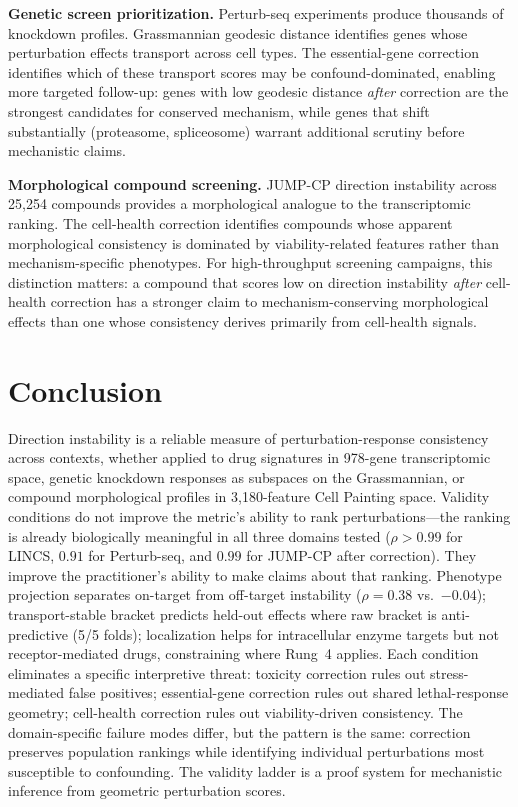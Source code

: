 \documentclass{article}
\begin{document}
\textbf{Genetic screen prioritization.} Perturb-seq experiments produce
thousands of knockdown profiles. Grassmannian geodesic distance identifies
genes whose perturbation effects transport across cell types. The
essential-gene correction identifies which of these transport scores may be
confound-dominated, enabling more targeted follow-up: genes with low
geodesic distance \emph{after} correction are the strongest candidates for
conserved mechanism, while genes that shift substantially (proteasome,
spliceosome) warrant additional scrutiny before mechanistic claims.

\textbf{Morphological compound screening.} JUMP-CP direction instability
across 25{,}254 compounds provides a morphological analogue to the
transcriptomic ranking. The cell-health correction identifies compounds
whose apparent morphological consistency is dominated by viability-related
features rather than mechanism-specific phenotypes. For high-throughput
screening campaigns, this distinction matters: a compound that scores low
on direction instability \emph{after} cell-health correction has a stronger
claim to mechanism-conserving morphological effects than one whose
consistency derives primarily from cell-health signals.

\section{Conclusion}

Direction instability is a reliable measure of perturbation-response
consistency across contexts, whether applied to drug signatures in 978-gene
transcriptomic space, genetic knockdown responses as subspaces on the
Grassmannian, or compound morphological profiles in 3{,}180-feature Cell
Painting space. Validity conditions do not improve the metric's ability to
rank perturbations---the ranking is already biologically meaningful in all
three domains tested ($\rho > 0.99$ for LINCS, $0.91$ for Perturb-seq,
and $0.99$ for JUMP-CP after correction).
They improve the practitioner's ability to make claims about that ranking.
Phenotype projection separates on-target from off-target instability
($\rho = 0.38$ vs.\ $-0.04$); transport-stable bracket predicts held-out
effects where raw bracket is anti-predictive (5/5 folds); localization
helps for intracellular enzyme targets but not receptor-mediated drugs,
constraining where Rung~4 applies. Each condition eliminates a specific
interpretive threat: toxicity correction rules out stress-mediated false
positives; essential-gene correction rules out shared lethal-response
geometry; cell-health correction rules out viability-driven consistency.
The domain-specific failure modes differ, but the pattern is the same:
correction preserves population rankings while identifying individual
perturbations most susceptible to confounding. The validity ladder is a
proof system for mechanistic inference from geometric perturbation scores.



\end{document}
